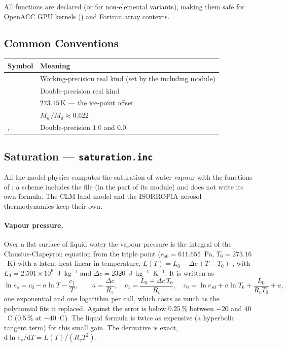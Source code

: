 All functions are declared  (or  for
non-elemental variants), making them safe for OpenACC GPU kernels
() and Fortran array contexts.

\subsection{Common Conventions}

\begin{longtable}{L{3cm} L{11cm}}
  \toprule
  \textbf{Symbol} & \textbf{Meaning} \\
  \midrule
  \endhead
  \bottomrule
  \endfoot
     & Working-precision real kind (set by the including module) \\
     & Double-precision real kind \\
   & $273.15$\,K --- the ice-point offset \\
     & $M_w/M_d \approx 0.622$ \\
  ,  & Double-precision $1.0$ and $0.0$ \\
\end{longtable}

\subsection{Saturation --- \texttt{saturation.inc}}

All the model physics computes the saturation of water vapour with the
functions of ; a scheme includes the file (in the
 part of its module) and does not write its own formula. The
CLM land model and the ISORROPIA aerosol thermodynamics keep their own.

\paragraph{Vapour pressure.}
Over a flat surface of liquid water the vapour pressure is the integral of
the Clausius-Clapeyron equation from the triple point
($e_{s0} = 611.655$~Pa, $T_0 = 273.16$~K) with a latent heat linear in
temperature, $L(T) = L_0 - \Delta c\,(T-T_0)$ \citep[as in][]{ambaum2020},
with $L_0 = 2.501\times10^6$~J~kg$^{-1}$ and
$\Delta c = 2320$~J~kg$^{-1}$~K$^{-1}$. It is written as
\begin{equation}
  \ln e_s = c_0 - a \ln T - \frac{c_1}{T}, \qquad a = \frac{\Delta c}{R_v},
  \quad c_1 = \frac{L_0 + \Delta c\, T_0}{R_v}, \quad
  c_0 = \ln e_{s0} + a \ln T_0 + \frac{L_0}{R_v T_0} + a,
\end{equation}
one exponential and one logarithm per call, which costs as much as the
polynomial fits it replaced. Against \citet{murphy2005} the error is below
0.25\,\% between $-20$ and $40$~\textdegree C (0.5\,\% at
$-40$~\textdegree C). The \citet{murphy2005} liquid formula is twice as
expensive (a hyperbolic tangent term) for this small gain. The derivative is
exact, $\mathrm{d}\ln e_s/\mathrm{d}T = L(T)/(R_v T^2)$.

